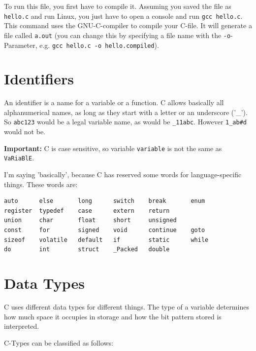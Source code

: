 \documentclass[a4paper, 11pt]{article}
\newcommand{\code}[1]{\texttt{#1}}
\begin{document}
To run this file, you first have to compile it. Assuming you saved the file as \code{hello.c} and run Linux, you just have to open a console and run \code{gcc hello.c}. This command uses the GNU-C-compiler to compile your C-file. It will generate a file called \code{a.out} (you can change this by specifying a file name with the \code{-o}-Parameter, e.g. \code{gcc hello.c -o hello.compiled}).

\section{Identifiers}
An identifier is a name for a variable or a function. C allows basically all alphanumerical names, as long as they start with a letter or an underscore ('\_'). So \code{abc123} would be a legal variable name, as would be \code{\_11abc}. However \code{1\_ab\#d} would not be. 

\vspace{10px}
\noindent
\textbf{Important:} C is case sensitive, so variable \code{variable} is not the same as \code{VaRiaBlE}.

\vspace{10px}
\noindent
I'm saying 'basically', because C has reserved some words for language-specific things. These words are:

\begin{verbatim}
auto      else       long      switch    break       enum
register  typedef    case      extern    return
union     char       float     short     unsigned
const     for        signed    void      continue    goto
sizeof    volatile   default   if        static      while
do        int        struct    _Packed   double
\end{verbatim}

\newpage

\section{Data Types}
C uses different data types for different things. The type of a variable determines how much space it occupies in storage and how the bit pattern stored is interpreted.

C-Types can be classified as follows:
\end{document}
